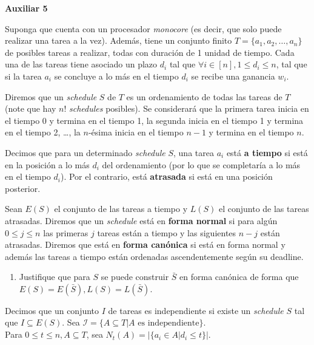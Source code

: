 

\header
\begin{center}
	\LARGE \bf{Auxiliar 5}
\end{center}

Suponga que cuenta con un procesador \textit{monocore} (es decir, que solo puede realizar una tarea a la vez).
Además, tiene un conjunto finito $T = \{a_1, a_2, \dots, a_n\}$ de posibles tareas a realizar, todas con duración de 1 unidad de tiempo.
Cada una de las tareas tiene asociado un plazo $d_i$ tal que $\forall i \in [n], 1\leq d_i \leq n$, tal que si la tarea $a_i$ se concluye a lo más en el tiempo $d_i$ se recibe una ganancia $w_i$.

Diremos que un \textit{schedule} $S$ de $T$ es un ordenamiento de todas las tareas de $T$ (note que hay $n!$ \textit{schedules} posibles). Se considerará que la primera tarea inicia en el tiempo 0 y termina en el tiempo 1, la segunda inicia en el tiempo 1 y termina en el tiempo 2, \dots, la $n$-ésima inicia en el tiempo $n-1$ y termina en el tiempo $n$.

Decimos que para un determinado \textit{schedule} $S$, una tarea $a_i$ está \textbf{a tiempo} si está en la posición a lo más $d_i$ del ordenamiento (por lo que se completaría a lo más en el tiempo $d_i$). Por el contrario, está \textbf{atrasada} si está en una posición posterior.

Sean $E(S)$ el conjunto de las tareas a tiempo y $L(S)$ el conjunto de las tareas atrasadas.
Diremos que un \textit{schedule} está en \textbf{forma normal} si para algún $0\leq j\leq n$ las primeras $j$ tareas están a tiempo y las siguientes $n-j$ están atrasadas. Diremos que está en \textbf{forma canónica} si está en forma normal y además las tareas a tiempo están ordenadas ascendentemente según su deadline.


\begin{enumerate}[label ={\bf P\arabic*}]
	\item Justifique que para $S$ se puede construir $\bar{S}$ en forma canónica de forma que $E(S)=E(\bar{S}), L(S)=L(\bar{S})$.
\end{enumerate}
    
    Decimos que un conjunto $I$ de tareas es independiente si existe un \textit{schedule} $S$ tal que $I\subseteq E(S)$. Sea $\mathcal{I} =\{A \subseteq T | A \text{ es independiente}\}$.\\

    Para $0\leq t \leq n, A \subseteq T$, sea $N_t(A) = |\{a_i \in A | d_i \leq t\}|$.

